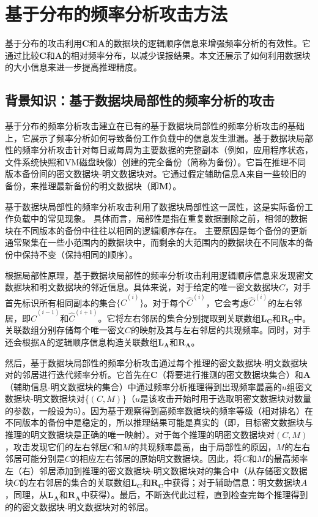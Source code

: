 \chapter{基于分布的频率分析攻击方法}
\label{sec:DistributionAttack}

基于分布的攻击利用$\mathbf{C}$和$\mathbf{A}$的数据块的逻辑顺序信息来增强频率分析的有效性。它通过比较$\mathbf{C}$和$\mathbf{A}$的相对频率分布，以减少误报结果。本文还展示了如何利用数据块的大小信息来进一步提高推理精度。

\section{背景知识：基于数据块局部性的频率分析的攻击}

\label{sec:DistributionAttack-prior-attack}

基于分布的频率分析攻击建立在已有的基于数据块局部性的频率分析攻击的基础上，它展示了频率分析如何导致备份工作负载中的信息发生泄漏。基于数据块局部性的频率分析攻击针对每日或每周为主要数据的完整副本（例如，应用程序状态，文件系统快照和VM磁盘映像）创建的完全备份（简称为备份）。它旨在推理不同版本备份间的密文数据块-明文数据块对。它通过假定辅助信息$\mathbf{A}$来自一些较旧的备份，来推理最新备份的明文数据块（即$\mathbf{M}$）。

基于数据块局部性的频率分析攻击利用了数据块局部性这一属性，这是实际备份工作负载中的常见现象。 具体而言，局部性是指在重复数据删除之前，相邻的数据块在不同版本的备份中往往以相同的逻辑顺序存在。 主要原因是每个备份的更新通常聚集在一些小范围内的数据块中，而剩余的大范围内的数据块在不同版本的备份中保持不变（保持相同的顺序）。

根据局部性原理，基于数据块局部性的频率分析攻击利用逻辑顺序信息来发现密文数据块和明文数据块的邻近信息。具体来说，对于给定的唯一密文数据块$C$，对手首先标识所有相同副本的集合$\{\hat{C}^{(i)}\}$。对于每个$\hat{C}^{(i)}$，它会考虑$\hat{C}^{(i)}$的左右邻居，即$\hat{C}^{(i-1)}$和$\hat{C}^{(i+1)}$。它将左右邻居的集合分别提取到关联数组$\mathbf{L_C}$和$\mathbf{R_C}$中。关联数组分别存储每个唯一密文$C$的映射及其与左右邻居的共现频率。同时，对手还会根据$\mathbf{A}$的逻辑顺序信息构造关联数组$\mathbf{L_A}$和$\mathbf{R_A}$。

然后，基于数据块局部性的频率分析攻击通过每个推理的密文数据块-明文数据块对的邻居进行迭代频率分析。它首先在$\mathbf{C}$（将要进行推测的密文数据块集合）和$\mathbf{A}$（辅助信息-明文数据块的集合）中通过频率分析推理得到出现频率最高的$u$组密文数据块-明文数据块对\{$(C,M)$\}（$u$是该攻击开始时用于选取明密文数据块对数量的参数，一般设为5）。因为基于观察得到高频率数据块的频率等级（相对排名）在不同版本的备份中是稳定的，所以推理结果可能是真实的（即，目标密文数据块与推理的明文数据块是正确的唯一映射）。对于每个推理的明密文数据块对$(C,M)$，攻击发现它们的左右邻居$C$和$M$的共现频率最高，由于局部性的原因，$M$的左右邻居可能分别是$C$的相应左右邻居的原始明文数据块。因此，将$C$和$M$的最高频率左（右）邻居添加到推理的密文数据块-明文数据块对的集合中（从存储密文数据块$C$的左右邻居的集合的关联数组$\mathbf{L_C}$和$\mathbf{R_C}$中获得；对于辅助信息：明文数据块$A$，同理，从$\mathbf{L_A}$和$\mathbf{R_A}$中获得）。最后，不断迭代此过程，直到检查完每个推理得到的的密文数据块-明文数据块对的邻居。

